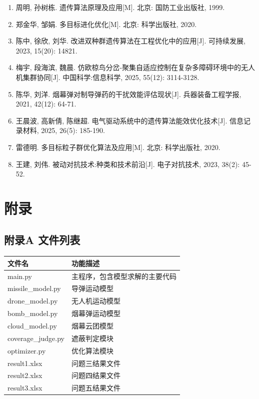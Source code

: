 \documentclass[12pt,a4paper]{article}
\begin{document}
\begin{enumerate}
\item 周明, 孙树栋. 遗传算法原理及应用[M]. 北京: 国防工业出版社, 1999.

\item 郑金华, 邹娟. 多目标进化优化[M]. 北京: 科学出版社, 2020.

\item 陈中, 徐欣, 刘华. 改进双种群遗传算法在工程优化中的应用[J]. 可持续发展, 2023, 15(20): 14821.

\item 梅宇, 段海滨, 魏晨. 仿欧椋鸟分岔-聚集自适应控制在复杂多障碍环境中的无人机集群协同[J]. 中国科学:信息科学, 2025, 55(12): 3114-3128.

\item 陈华, 刘洋. 烟幕弹对制导弹药的干扰效能评估现状[J]. 兵器装备工程学报, 2021, 42(12): 64-71.

\item 王晨波, 高新倩, 陈继超. 电气驱动系统中的遗传算法能效优化技术[J]. 信息记录材料, 2025, 26(5): 185-190.

\item 雷德明. 多目标粒子群优化算法及应用[M]. 北京: 科学出版社, 2020.

\item 王建, 刘伟. 被动对抗技术:种类和技术前沿[J]. 电子对抗技术, 2023, 38(2): 45-52.
\end{enumerate}


\section*{附录}

\subsection*{附录A 文件列表}

\begin{table}[H]
\centering
\begin{tabular}{ll}
\toprule
\textbf{文件名} & \textbf{功能描述} \\
\midrule
main.py & 主程序，包含模型求解的主要代码 \\
missile\_model.py & 导弹运动模型 \\
drone\_model.py & 无人机运动模型 \\
bomb\_model.py & 烟幕弹运动模型 \\
cloud\_model.py & 烟幕云团模型 \\
coverage\_judge.py & 遮蔽判定模块 \\
optimizer.py & 优化算法模块 \\
result1.xlsx & 问题三结果文件 \\
result2.xlsx & 问题四结果文件 \\
result3.xlsx & 问题五结果文件 \\
\bottomrule
\end{tabular}
\end{table}
\end{document}
